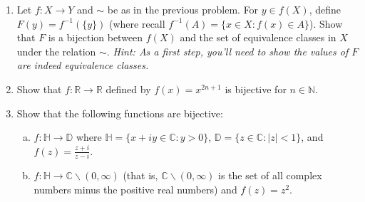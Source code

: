 \documentclass[a4paper,12pt,dvipsnames]{book}
\numberwithin{theorem}{chapter}
\theoremstyle{remark}
\def\C{{\mathbb{C}}}
\begin{document}
\begin{enumerate}
\begin{solution}
\begin{proof}
We need to verify reflexivity, symmetry, and transitivity:
\begin{itemize}
\item (Reflexivity) Let $x\in X$. Since $f(x)=f(x)$, we have $x\sim x$, so reflexivity holds.
\item (Symmetry) Let $x,y\in X$ and suppose $x\sim y$. Then $f(x)=f(y)$, so $f(y)=f(x)$, thus $y\sim x$ and symmetry holds. 
\item (Transitivity)  Let $x,y,z\in X$ and suppose $x\sim y$ and $y\sim z$. Then $f(x)=f(y)=f(z)$, so $f(x)=f(z)$, hence $x\sim z$. This proves transitivity. 
\end{itemize}
\end{proof}
\end{solution}



\item  Let $f:X\rightarrow Y$ and $\sim$ be as in the previous problem.  For $y\in f(X)$, define  $F(y)=f^{-1}(\{y\})$ (where recall $f^{-1}(A)=\{x\in X: f(x)\in A\}$).  Show that $F$ is a bijection between $f(X)$ and the set of equivalence classes in $X$ under the relation $\sim$. {\it Hint: 
As a first step, you'll need to show the values of $F$ are indeed equivalence classes. }

\item Show that $f:\mathbb{R}\rightarrow \mathbb{R}$ defined by $f(x)=x^{2n+1}$ is bijective for $n\in\mathbb{N}$. 



\item Show that the following functions are bijective:

\begin{enumerate}[(a)]
\item $f:\mathbb{H}\rightarrow \mathbb{D}$ where $\mathbb{H} = \{x+iy\in \C: y>0\}$, $\mathbb{D}=\{z\in\C:|z|<1\}$, and $f(z)=\frac{z+i}{z-i}$. 

\item $f:\mathbb{H}\rightarrow \C\backslash (0,\infty)$ (that is, $\mathbb{C}\backslash (0,\infty)$ is the set of all complex numbers minus the positive real numbers) and $f(z)=z^2$.


\end{enumerate}
\end{enumerate}
\end{document}
